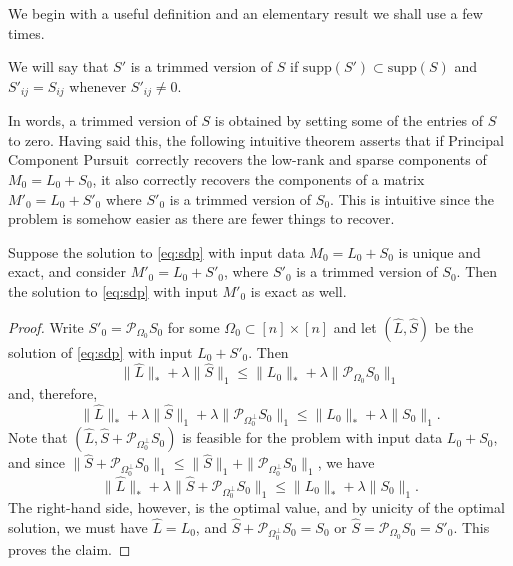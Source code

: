 We begin with a useful definition and an elementary result we shall use a few times.

\begin{definition}
  We will say that $S'$ is a trimmed version of $S$ if
  $\text{supp}(S') \subset \text{supp}(S)$ and $S'_{ij} = S_{ij}$ whenever $S'_{ij} \neq 0$. 
\end{definition}

In words, a trimmed version of $S$ is obtained by setting some of the entries of $S$ to zero.  Having said this, the following intuitive theorem asserts that if Principal Component Pursuit\, correctly recovers the low-rank and sparse components of $M_0 = L_0 + S_0$, it also correctly recovers the components of a matrix $M'_0 = L_0 + S'_0$ where $S'_0$ is a trimmed version of $S_0$. This is intuitive since the problem is somehow easier as there are fewer things to recover.

\begin{theorem}
\label{teo:elimination}
Suppose the solution to \eqref{eq:sdp} with input data $M_0 = L_0 + S_0$ is unique and exact, and consider $M'_0 = L_0 + S'_0$, where $S'_0$ is a trimmed version of $S_0$. Then the solution to \eqref{eq:sdp}
with input $M'_0$ is exact as well.
\end{theorem}

\begin{proof}
  Write $S'_0 = \mathcal{P}_{\Omega_0} S_0$ for some $\Omega_0 \subset [n]
  \times [n]$ and let $(\hat{L}, \hat{S})$ be the solution of
  \eqref{eq:sdp} with input $L_0+S'_0$. Then
\[
\|\hat{L}\|_* + \lambda \|\hat{S}\|_1 \le \|L_0\|_* + \lambda
\|\mathcal{P}_{\Omega_0} S_0\|_1
\]
and, therefore,
\[
\|\hat{L}\|_* + \lambda \|\hat{S}\|_1 + \lambda \|\mathcal{P}_{\Omega_0^\perp} S_0\|_1
\le \|L_0\|_* + \lambda \|S_0\|_1.
\]
Note that $({\hat L}, \hat{S} + \mathcal{P}_{\Omega_0^\perp} S_0)$ is feasible for the problem with input data $L_0 + S_0$, and since $\|\hat{S} +
\mathcal{P}_{\Omega_0^\perp} S_0\|_1 \le \|\hat{S}\|_1 +
\|\mathcal{P}_{\Omega_0^\perp} S_0\|_1$, we have
\[
\|\hat{L}\|_* + \lambda \|\hat{S} + \mathcal{P}_{\Omega_0^\perp} S_0\|_1 \le \|L_0\|_* +
\lambda \|S_0\|_1. 
\]
The right-hand side, however, is the optimal value, and by unicity of the optimal solution, we must have $\hat{L} = L_0$, and $\hat{S} +
\mathcal{P}_{\Omega_0^\perp} S_0 = S_0$ or $\hat{S} = \mathcal{P}_{\Omega_0} S_0 = S'_0$. This proves the claim.
\end{proof}

 

